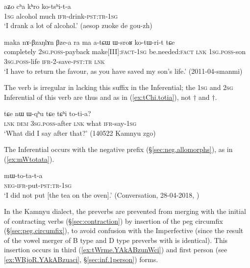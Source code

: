 \begin{exe}
\ex \label{ex:cha.kotshita}
\gll aʑo cʰa kʰro ko-tsʰi-t-a \\
\textsc{1sg} alcohol much \textsc{ifr}-drink-\textsc{pst}:\textsc{tr}-\textsc{1sg} \\
\glt `I drank a lot of alcohol.' (aesop zuoke de gou-zh)
\end{exe}

\begin{exe}
\ex \label{ex:WsroR.kotWrit}
\gll maka nɤ-βzaŋlɤn βze-a ra ma a-tɕɯ ɯ-sroʁ ko-tɯ-ri-t tɕe \\
completely \textsc{2sg}.\textsc{poss}-payback make[III]:\textsc{fact}-\textsc{1sg} be.needed:\textsc{fact} \textsc{lnk} \textsc{1sg}.\textsc{poss}-son \textsc{3sg}.\textsc{poss}-life \textsc{ifr}-2-save-\textsc{pst}:\textsc{tr} \textsc{lnk} \\
\glt `I have to return the favour, as you have saved my son's life.' (2011-04-smanmi)
\end{exe}

The verb  is irregular in lacking this suffix in the Inferential; the \textsc{1sg} and \textsc{2sg} Inferential of this verb are thus  and  as in (\ref{ex:tChi.totia}), not $\dagger$ and $\dagger$.

\begin{exe}
\ex \label{ex:tChi.totia}
\gll tɕe nɯ ɯ-qʰu tɕe tɕʰi to-ti-a? \\
\textsc{lnk} \textsc{dem} \textsc{3sg}.\textsc{poss}-after \textsc{lnk} what \textsc{ifr}-say-\textsc{1sg} \\
\glt `What did I say after that?' (140522 Kamnyu zgo) 
\end{exe}
 
The Inferential occurs with the negative prefix  (§\ref{sec:neg.allomorphs}), as in (\ref{ex:mWtotata}).

\begin{exe}
\ex \label{ex:mWtotata}
\gll mɯ-to-ta-t-a \\
\textsc{neg}-\textsc{ifr}-put-\textsc{pst}:\textsc{tr}-\textsc{1sg} \\
\glt `I did not put [the tea on the oven].' (Conversation, 28-04-2018, )
\end{exe}

In the Kamnyu dialect, the preverbs are prevented from merging with the initial  of contracting verbs (§\ref{sec:contraction}) by insertion of the peg circumfix (§\ref{sec:peg.circumfix}), to avoid confusion with the Imperfective (since the result of the vowel merger of B type and D type preverbs with  is identical). This insertion occurs in third (\ref{ex:tWrme.YAkABzunWci}) and first person (see \ref{ex:WRjoR.YAkABzuaci}, §\ref{sec:inf.1person}) forms.



